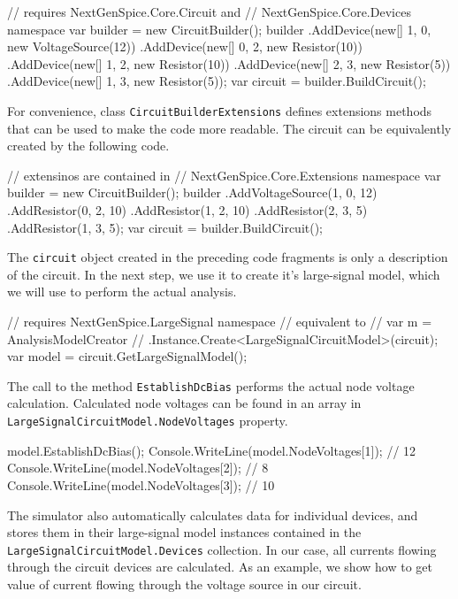 \begin{csharpcode}
// requires NextGenSpice.Core.Circuit and
// NextGenSpice.Core.Devices namespace
var builder = new CircuitBuilder();
builder
	.AddDevice(new[] {1, 0}, new VoltageSource(12))
	.AddDevice(new[] {0, 2}, new Resistor(10))
	.AddDevice(new[] {1, 2}, new Resistor(10))
	.AddDevice(new[] {2, 3}, new Resistor(5))
	.AddDevice(new[] {1, 3}, new Resistor(5));
var circuit = builder.BuildCircuit();
\end{csharpcode}

For convenience, class \texttt{CircuitBuilderExtensions} defines extensions methods that can be used to make the code more readable. The circuit can be equivalently created by the following code.

\begin{csharpcode}
// extensinos are contained in 
// NextGenSpice.Core.Extensions namespace
var builder = new CircuitBuilder();
builder
	.AddVoltageSource(1, 0, 12)
	.AddResistor(0, 2, 10)
	.AddResistor(1, 2, 10)
	.AddResistor(2, 3, 5)
	.AddResistor(1, 3, 5);
var circuit = builder.BuildCircuit();
\end{csharpcode}

The \texttt{circuit} object created in the preceding code fragments is only a description of the circuit. In the next step, we use it to create it's large-signal model, which we will use to perform the actual analysis.

\begin{csharpcode}
// requires NextGenSpice.LargeSignal namespace
// equivalent to
// var m = AnalysisModelCreator
//     .Instance.Create<LargeSignalCircuitModel>(circuit);
var model = circuit.GetLargeSignalModel();
\end{csharpcode}

The call to the method \texttt{EstablishDcBias} performs the actual node voltage calculation. Calculated node voltages can be found in an array in \texttt{LargeSignal\+CircuitModel.NodeVoltages} property.

\begin{csharpcode}
model.EstablishDcBias();
Console.WriteLine(model.NodeVoltages[1]); // 12 
Console.WriteLine(model.NodeVoltages[2]); //  8 
Console.WriteLine(model.NodeVoltages[3]); // 10 
\end{csharpcode}

The simulator also automatically calculates data for individual devices, and stores them in their large-signal model instances contained in the \texttt{LargeSignal\+CircuitModel.Devices} collection. In our case, all currents flowing through the circuit devices are calculated. As an example, we show how to get value of current flowing through the voltage source in our circuit. 

